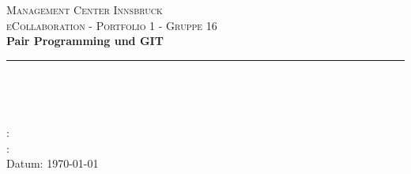 
\begin{titlepage}
	\begin{center}
		
		
		\textsc{\LARGE Management Center Innsbruck}\\[1.5cm]
		\textsc{\Large eCollaboration - Portfolio 1 - Gruppe 16}\\[0.5cm]
		\vfill
		{ \huge \bfseries Pair Programming und GIT \\[0.4cm] }
		\hrule ~\\[1.5cm]
		\vfill
		
		
\begin{flushleft} \large
\study \\

\def\termname{}
\term \termname

\def\lecturername{}
\lecturername: \lecturer \\

\def\authorname{}
\authorname: \student \\
		\vspace{1.2cm}
		Datum: \today
\end{flushleft}
\newpage	
		
		
	\end{center}
\end{titlepage}